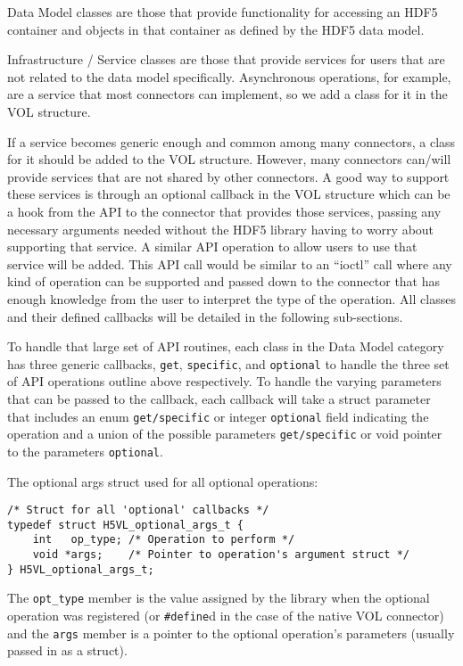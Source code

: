 Data Model classes are those that provide functionality for accessing an HDF5 container and objects in that container as defined by the HDF5 data model.

Infrastructure / Service classes are those that provide services for users that are not related to the data model specifically. Asynchronous operations, for example, are a service that most connectors can implement, so we add a class for it in the VOL structure.

If a service becomes generic enough and common among many connectors, a class for it should be added to the VOL structure. However, many connectors can/will provide services that are not shared by other connectors. A good way to support these services is through an optional callback in the VOL structure which can be a hook from the API to the connector that provides those services, passing any necessary arguments needed without the HDF5 library having to worry about supporting that service. A similar API operation to allow users to use that service will be added. This API call would be similar to an “ioctl” call where any kind of operation can be supported and passed down to the connector that has enough knowledge from the user to interpret the type of the operation. All classes and their defined callbacks will be detailed in the following sub-sections.

To handle that large set of API routines, each class in the Data Model category has three generic callbacks, \texttt{get}, \texttt{specific}, and \texttt{optional} to handle the three set of API operations outline above respectively. To handle the varying parameters that can be passed to the callback, each callback will take a struct parameter that includes an enum {\tt get/specific} or integer {\tt optional} field indicating the operation and a union of the possible parameters {\tt get/specific} or void pointer to the parameters {\tt optional}.

The optional args struct used for all optional operations:
\begin{lstlisting}
/* Struct for all 'optional' callbacks */
typedef struct H5VL_optional_args_t {
    int   op_type; /* Operation to perform */
    void *args;    /* Pointer to operation's argument struct */
} H5VL_optional_args_t;
\end{lstlisting}

The {\tt opt\_type} member is the value assigned by the library when the optional operation was registered (or {\tt \#define}d in the case of the native VOL connector) and the {\tt args} member is a pointer to the optional operation's parameters (usually passed in as a struct).


